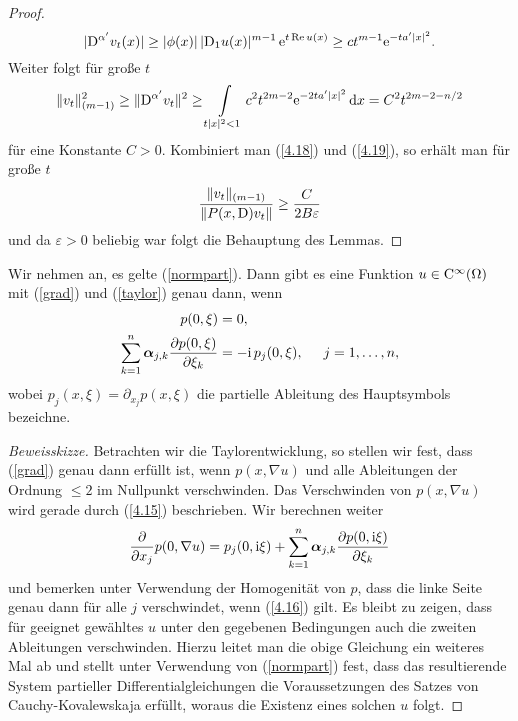 \begin{proof}
\begin{equation}
 |\mathrm D^{\alpha'} v_t(x)| \ge |\phi(x)|\, |\mathrm D_1 u(x)|^{m-1} \,\mathrm e^{t \operatorname{Re} u(x)} \ge ct^{m-1}\mathrm e^{-ta'|x|^2}.
\end{equation}
Weiter folgt für große $t$    
\begin{equation}
	\label{4.19}
\lVert v_t \rVert_{(m-1)}^2 \ge \lVert \mathrm D^{\alpha'} v_t\rVert^2 \ge \int\limits_{t|x|^2 < 1}c^2t^{2m-2}\mathrm e^{-2ta'|x|^2} \,\mathrm d x = C^2 t^{2m-2-n/2}
\end{equation}
für eine Konstante $C > 0$. Kombiniert man (\ref{4.18}) und (\ref{4.19}), so erhält man für große $t$
\begin{equation}
\dfrac{\lVert v_t \rVert_{(m-1)}}{\lVert P(x,\mathrm D) v_t \rVert} \ge \dfrac{C}{2B\varepsilon}
\end{equation}
und da $\varepsilon>0$ beliebig war folgt die Behauptung des Lemmas.
\end{proof}

\begin{lem}\label{lem2}
Wir nehmen an, es gelte (\ref{normpart}). Dann gibt es eine Funktion $u \in \mathrm C^\infty(\Omega)$ mit (\ref{grad}) und (\ref{taylor}) genau dann, wenn
\begin{align}
	\label{4.15}
p(0, \xi) &= 0, \\ 	\label{4.16}
\sum_{k=1}^{n} \boldsymbol\alpha_{j,k}\frac{\partial p(0,\xi)}{\partial \xi_k} &= -\mathrm i\,  p_j(0,\xi), \hspace{0.5cm} j=1, \ldots, n, 
\end{align}
wobei $ p_j(x,\xi) = \partial_{x_j}  p(x,\xi)$ die partielle Ableitung des Hauptsymbols bezeichne.
\end{lem}

\begin{proof} [Beweisskizze]
Betrachten wir die Taylorentwicklung, so stellen wir fest, dass (\ref{grad}) genau dann erfüllt ist, wenn $p(x,\nabla u)$ und alle Ableitungen der Ordnung $\le 2$ im Nullpunkt verschwinden. Das Verschwinden von $p(x,\nabla u)$ wird gerade durch (\ref{4.15}) beschrieben. Wir berechnen weiter
\begin{equation}
\dfrac{\partial}{\partial x_j} p(0,\nabla u) = 
p_j(0,\mathrm i\xi) + \sum_{k=1}^{n} \boldsymbol\alpha_{j,k} \dfrac{\partial p(0,\mathrm i\xi)}{\partial \xi_k}
\end{equation}
und bemerken unter Verwendung der Homogenität von $p$, dass die linke Seite genau dann für alle $j$ verschwindet, wenn (\ref{4.16}) gilt. Es bleibt zu zeigen, dass für geeignet gewähltes $u$ unter den gegebenen Bedingungen auch die zweiten Ableitungen verschwinden. Hierzu leitet man die obige Gleichung ein weiteres Mal ab und stellt unter Verwendung von (\ref{normpart}) fest, dass das resultierende System partieller Differentialgleichungen die Voraussetzungen des Satzes von Cauchy-Kovalewskaja erfüllt, woraus die Existenz eines solchen $u$ folgt.
\end{proof}

